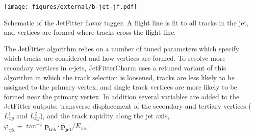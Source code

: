 \begin{cfig}
  \texttt{[image: figures/external/b-jet-jf.pdf]}
  \caption[JetFitter flavor tagging]{Schematic of the JetFitter flavor tagger. A flight line is fit to all tracks in the jet, and vertices are formed where tracks cross the flight line.}
  \label{fig:b-jet-jf}
\end{cfig}

The JetFitter algorithm relies on a number of tuned parameters which specify which tracks are considered and how vertices are formed. To resolve more secondary vertices in $c$-jets, JetFitterCharm uses a retuned variant of this algorithm in which the track selection is loosened, tracks are less likely to be assigned to the primary vertex, and single track vertices are more likely to be formed near the primary vertex. In addition several variables are added to the JetFitter outputs: transverse displacement of the secondary and tertiary vertices ($L^1_{xy}$ and $L^2_{xy}$), and the track rapidity along the jet axis, $\varphi_{\text{trk}} \equiv \tan^{-1} \mathbf{p_{\text{trk}}} \cdot \mathbf{\hat{p}_{\text{jet}}} / E_{\text{trk}}$.

